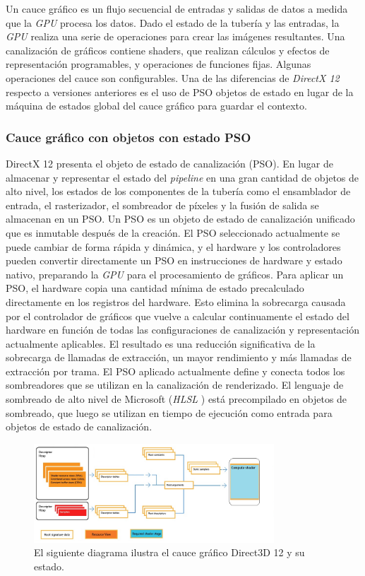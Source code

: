 \documentclass[a4paper]{book}
\begin{document}
Un cauce gráfico es un flujo secuencial de entradas y salidas de datos a medida que la \textit{GPU} procesa los datos.
Dado el estado de la tubería y las entradas, la \textit{GPU} realiza una serie de operaciones para crear las imágenes resultantes.
Una canalización de gráficos contiene shaders, que realizan cálculos y efectos de representación programables, y operaciones
de funciones fijas. Algunas operaciones del cauce son configurables. Una de las diferencias de \textit{DirectX 12} respecto a
versiones anteriores es el uso de PSO objetos de estado en lugar de la máquina de estados global del cauce gráfico para guardar el contexto.

\subsubsection{Cauce gráfico con objetos con estado PSO}
\label{subsubsec:PSO}

DirectX 12 presenta el objeto de estado de canalización (PSO). En lugar de almacenar y representar el estado del \textit{pipeline}
en una gran cantidad de objetos de alto nivel, los estados de los componentes de la tubería como el ensamblador de entrada,
el rasterizador, el sombreador de píxeles y la fusión de salida se almacenan en un PSO. Un PSO es un objeto de estado de
canalización unificado que es inmutable después de la creación. El PSO seleccionado actualmente se puede cambiar de forma rápida
y dinámica, y el hardware y los controladores pueden convertir directamente un PSO en instrucciones de hardware y estado nativo,
preparando la \textit{GPU} para el procesamiento de gráficos. Para aplicar un PSO, el hardware copia una cantidad mínima de estado
precalculado directamente en los registros del hardware. Esto elimina la sobrecarga causada por el controlador de gráficos que vuelve a calcular
continuamente el estado del hardware en función de todas las configuraciones de canalización y representación actualmente
aplicables. El resultado es una reducción significativa de la sobrecarga de llamadas de extracción, un mayor rendimiento
y más llamadas de extracción por trama. El PSO aplicado actualmente define y conecta todos los sombreadores que se utilizan en la
canalización de renderizado. El lenguaje de sombreado de alto nivel de Microsoft (\textit{HLSL} ) está precompilado en objetos de
sombreado, que luego se utilizan en tiempo de ejecución como entrada para objetos de estado de canalización. \cite{book:_directX}

\begin{figure}[H]
    \centering
    \includegraphics[width=9cm, keepaspectratio]{img/compute-pipeline.png}
    \caption{El siguiente diagrama ilustra el cauce gráfico Direct3D 12 y su estado.}
    \label{compute}
\end{figure}
\end{document}
